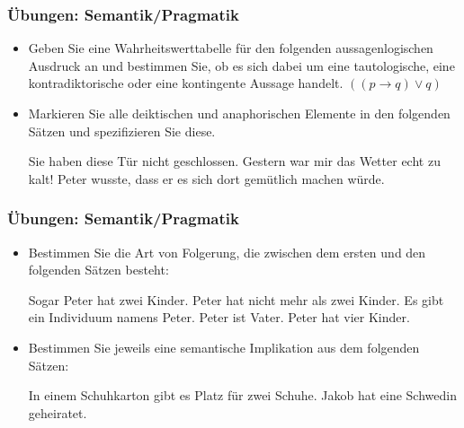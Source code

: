 \begin{frame}
\frametitle{Übungen: Semantik/Pragmatik}

\begin{itemize}
	
	\item Geben Sie eine Wahrheitswerttabelle für den folgenden aussagenlogischen Ausdruck an und bestimmen Sie, ob es sich dabei um eine tautologische, eine kontradiktorische oder eine kontingente Aussage handelt.
	\ea $((p \rightarrow q) \lor q)$
	\z 
	
	\item Markieren Sie alle deiktischen und anaphorischen Elemente in den folgenden Sätzen und spezifizieren Sie diese.
	
	\eal
	\ex Sie haben diese Tür nicht geschlossen.
	\ex Gestern war mir das Wetter echt zu kalt!
	\ex Peter wusste, dass er es sich dort gemütlich machen würde. 
	\zl
	
\end{itemize}

\end{frame}


\begin{frame}
\frametitle{Übungen: Semantik/Pragmatik}

\begin{itemize}
	\item Bestimmen Sie die Art von Folgerung, die zwischen dem ersten und den folgenden Sätzen besteht:
	
	\ea Sogar Peter hat zwei Kinder. 
	\ea Peter hat nicht mehr als zwei Kinder.
	\ex Es gibt ein Individuum namens Peter.
	\ex Peter ist Vater.
	\ex Peter hat vier Kinder.
	\z
	\z 
	
	\item Bestimmen Sie jeweils eine semantische Implikation aus dem folgenden Sätzen:
	
	\eal
	\ex In einem Schuhkarton gibt es Platz für zwei Schuhe.
	\ex Jakob hat eine Schwedin geheiratet.
	\zl
		
\end{itemize}

\end{frame}


